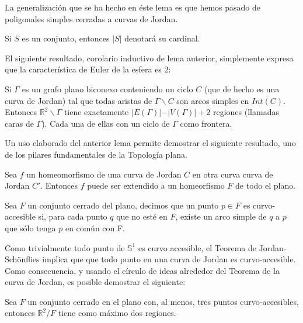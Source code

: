 	La generalización que se ha hecho en éste lema es que hemos pasado de poligonales simples cerradas a curvas de Jordan.
	
	\begin{definition}
Si $S$ es un conjunto, entonces $\vert S \vert$ denotará su cardinal.
\end{definition}
El siguiente resultado, corolario inductivo de lema anterior, simplemente expresa que la característica de Euler de la esfera es $2$:
\begin{lemma}
	Si $\Gamma$ es un grafo plano biconexo conteniendo un ciclo $C$ (que de hecho es una curva de Jordan) tal que todas aristas de $\Gamma \backslash C$ son arcos simples en $\overline{Int(C)}$. Entonces $\mathbb{R}^2 \backslash \Gamma$ tiene exactamente $\vert E(\Gamma) \vert - \vert V(\Gamma) \vert + 2$ regiones (llamadas caras de $\Gamma$). Cada una de ellas con un ciclo de $\Gamma$ como frontera.
\end{lemma}

Un uso elaborado del anterior lema  permite demostrar el siguiente resultado, uno de los pilares fundamentales de la Topología plana.

\begin{theorem}
	Sea $f$ un homeomorfismo de una curva de Jordan $C$ en otra curva curva de Jordan $C'$. Entonces $f$ puede ser extendido a un homeorfismo $F$ de todo el plano.
\end{theorem}
 

\begin{definition}
	Sea $F$ un conjunto cerrado del plano, decimos que un punto $p \in F$ es curvo-accesible si, para cada punto $q$ que no esté en $F$, existe un arco simple de $q$ a $p$ que sólo tenga $p$ en común con F.
\end{definition}

Como trivialmente todo punto de $\mathbb{S}^1$ es curvo accesible, el Teorema de Jordan-Schönflies implica que que todo punto en una curva de Jordan es curvo-accesible. Como consecuencia, y usando el círculo de ideas alrededor del Teorema de la curva de Jordan, es posible demostrar el siguiente:

\begin{theorem}
	Sea $F$ un conjunto cerrado en el plano con, al menos, tres puntos curvo-accesibles, entonces $\mathbb{R}^2 / F$ tiene como máximo dos regiones.
\end{theorem}

